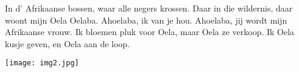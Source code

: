 \beginverse
In d' Afrikaanse bossen, waar alle negers krossen.
Daar in die wildernis, daar woont mijn Oela Oelaba.
\endverse
\beginchorus
Ahoelaba, ik van je hou.
Ahoelaba, jij wordt mijn Afrikaanse vrouw.
\endchorus
\beginverse
Ik bloemen pluk voor Oela, maar Oela ze verkoop.
Ik Oela kusje geven, en Oela aan de loop.
\endverse
\endsong
\begin{intersong}
    \texttt{[image: img2.jpg]}
\end{intersong}